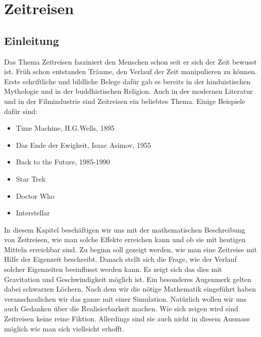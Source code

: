 \chapter{Zeitreisen\label{chapter:thema}}
\begin{refsection}
\section{Einleitung}
Das Thema Zeitreisen fasziniert den Menschen schon seit er sich der Zeit bewusst ist. Früh schon entstanden Träume, den Verlauf der Zeit manipulieren zu können. Erste schriftliche und bildliche Belege dafür gab es bereits in der hinduistischen Mythologie und in der buddhistischen Religion. Auch in der modernen Literatur und in der Filmindustrie sind Zeitreisen ein beliebtes Thema. Einige Beispiele daf\"ur sind: 
\begin{itemize}
    \item Time Machine, H.G.Wells, 1895 
    \item Das Ende der Ewigkeit, Isaac Asimov, 1955
    \item Back to the Future, 1985-1990
    \item Star Trek
    \item Doctor Who
    \item Interstellar

\end{itemize}
In diesem Kapitel beschäftigen wir uns mit der mathematischen Beschreibung von Zeitreisen, wie man solche Effekte erreichen kann und ob sie mit heutigen Mitteln erreichbar sind. Zu beginn soll gezeigt werden, wie man eine Zeitreise mit Hilfe der Eigenzeit beschreibt. Danach stellt sich die Frage, wie der Verlauf solcher Eigenzeiten beeinflusst werden kann. Es zeigt sich das dies mit Gravitation und Geschwindigkeit möglich ist. Ein besonderes Augenmerk gelten dabei schwarzen Löchern. Nach dem wir die nötige Mathematik eingeführt haben veranschaulichen wir das ganze mit einer Simulation. Natürlich wollen wir uns auch Gedanken über die Realisierbarkeit machen. Wie sich zeigen wird sind Zeitreisen keine reine Fiktion. Allerdings sind sie auch nicht in diesem Ausmass möglich wie man sich vielleicht erhofft.

\end{refsection}
